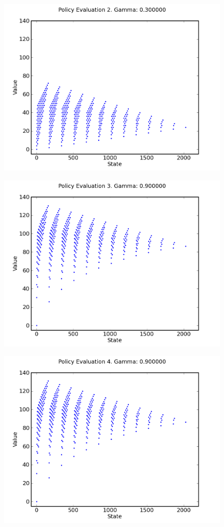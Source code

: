 \documentclass[a4paper]{article}
\begin{document}
\begin{figure}[h]
\center
\includegraphics[scale=0.75]{gamma_iteration/gamma_3_2.png}
\end{figure}

\begin{figure}[h]
\center
\includegraphics[scale=0.75]{gamma_iteration/gamma_9_3.png}
\end{figure}

\begin{figure}[h]
\center
\includegraphics[scale=0.75]{gamma_iteration/gamma_9_4.png}
\end{figure}
\end{document}

